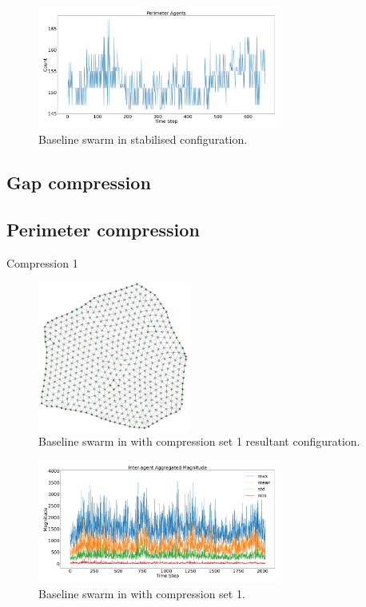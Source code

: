 \documentclass[12pt,a4paper]{IEEEtran}
\begin{document}
\begin{figure}[H]
	\begin{center}
		\includegraphics[width=8cm]{figures/baselineSwarmPerimeter}
	\end{center}
	\caption{Baseline swarm in stabilised configuration. \label{fig:baselineSwarmPerimeter}}
\end{figure}

\subsection{Gap compression}
\subsection{Perimeter compression}

Compression 1

\begin{figure}[H]
	\begin{center}
		\includegraphics[width=5cm]{figures/baselineSwarm1}
	\end{center}
	\caption{Baseline swarm in with compression set 1 resultant configuration. \label{fig:baselineSwarm1}}
\end{figure}

\begin{figure}[H]
	\begin{center}
		\includegraphics[width=8cm]{figures/baselineSwarmMagnitude1}
	\end{center}
	\caption{Baseline swarm in with compression set 1. \label{fig:baselineSwarmMagnitude1}}
\end{figure}
\end{document}
